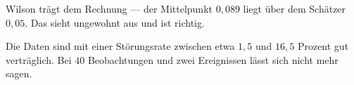 \begin{aufgabe}
Wilson trägt dem Rechnung --- der Mittelpunkt $0{,}089$ liegt über dem Schätzer $0{,}05$. Das sieht ungewohnt aus und ist richtig.

Die Daten sind mit einer Störungsrate zwischen etwa $1{,}5$ und $16{,}5$ Prozent gut verträglich. Bei $40$ Beobachtungen und zwei Ereignissen lässt sich nicht mehr sagen.

\begin{center}
\begin{minipage}{0.86\textwidth}
\end{minipage}
\end{center}
\end{aufgabe}

